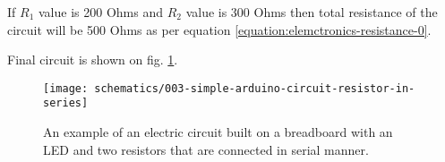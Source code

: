 \documentclass[../sparc.tex]{subfiles}
\begin{document}
If $R_1$ value is 200 Ohms and $R_2$ value is 300 Ohms then total resistance of
the circuit will be 500 Ohms as per equation
\ref{equation:elemctronics-resistance-0}.

Final circuit is shown on fig.
\ref{fig:breadboard-simple-arduino-circuit-resistor-in-series}.

\begin{figure}[ht]
  \centering
  \texttt{[image: schematics/003-simple-arduino-circuit-resistor-in-series]}
  \caption{An example of an electric circuit built on a breadboard with an LED
    and two resistors that are connected in serial manner.}
  \label{fig:breadboard-simple-arduino-circuit-resistor-in-series}
\end{figure}
\end{document}
